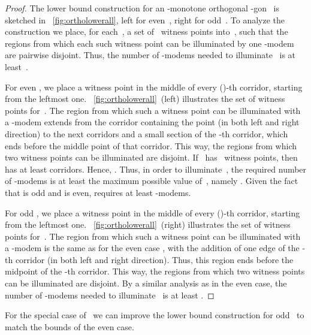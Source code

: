 \documentclass[A4]{article}
\begin{document}
\begin{proof}
  The lower bound construction for an -monotone orthogonal -gon~ is sketched in \figurename~\ref{fig:ortholowerall}, left for even~, right for odd~.
  To analyze the construction we place, for each~, a set of~ witness points into~, such that the regions from which each such witness point can be illuminated by one \mbox{-modem} are pairwise disjoint.
  Thus, the number of \mbox{-modems} needed to illuminate~ is at least~. 

         
  For even , we place a witness point in the middle of every ()-th corridor, starting from the leftmost one.
\figurename~\ref{fig:ortholowerall}~(left) illustrates the set of witness points for~.
The region from which such a witness point can be illuminated with a \mbox{-modem} extends from the corridor containing the point (in both left and right direction) to the next  corridors and a small section of the -th corridor, which ends before the middle point of that corridor. 
This way, the regions from which two witness points can be illuminated are disjoint.
  If~ has~ witness points, then~ has at least  corridors.
  Hence, .
  Thus, in order to illuminate~, the required number of \mbox{-modems} is at least the maximum possible value of~, namely .
  Given the fact that  is odd and  is even,  requires at least  \mbox{-modems}. 


  For odd , we place a witness point in the middle of every ()-th corridor, starting from the leftmost one.
\figurename~\ref{fig:ortholowerall}~(right) illustrates the set of witness points for~.
The region from which such a witness point can be illuminated with a \mbox{-modem} is the same as for the even case , with the addition of one edge of the -th corridor (in both left and right direction).
  Thus, this region ends before the midpoint of the -th corridor.
  This way, the regions from which two witness points can be illuminated are disjoint.
  By a similar analysis as in the even case, the number of \mbox{-modems} needed to illuminate~ is at least . \end{proof}	 


For the special case of~ we can improve the lower bound construction for odd~ to match the bounds of the even case.
\end{document}
